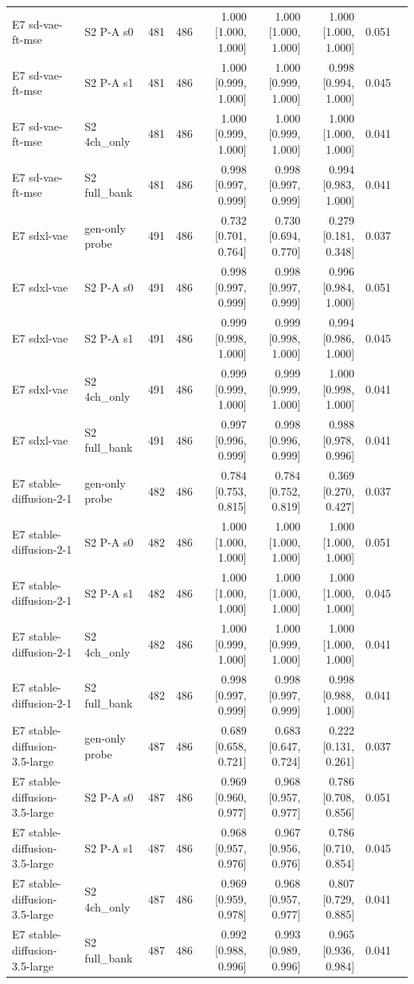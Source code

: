\begin{table}[htbp]
\begin{tabular}{llrrrrrrr}
E7 sd-vae-ft-mse & S2 P-A s0 & 481 & 486 & 1.000 [1.000, 1.000] & 1.000 [1.000, 1.000] & 1.000 [1.000, 1.000] & 0.051 &  \\
E7 sd-vae-ft-mse & S2 P-A s1 & 481 & 486 & 1.000 [0.999, 1.000] & 1.000 [0.999, 1.000] & 0.998 [0.994, 1.000] & 0.045 &  \\
E7 sd-vae-ft-mse & S2 4ch\_only & 481 & 486 & 1.000 [0.999, 1.000] & 1.000 [0.999, 1.000] & 1.000 [1.000, 1.000] & 0.041 &  \\
E7 sd-vae-ft-mse & S2 full\_bank & 481 & 486 & 0.998 [0.997, 0.999] & 0.998 [0.997, 0.999] & 0.994 [0.983, 1.000] & 0.041 &  \\
E7 sdxl-vae & gen-only probe & 491 & 486 & 0.732 [0.701, 0.764] & 0.730 [0.694, 0.770] & 0.279 [0.181, 0.348] & 0.037 &  \\
E7 sdxl-vae & S2 P-A s0 & 491 & 486 & 0.998 [0.997, 0.999] & 0.998 [0.997, 0.999] & 0.996 [0.984, 1.000] & 0.051 &  \\
E7 sdxl-vae & S2 P-A s1 & 491 & 486 & 0.999 [0.998, 1.000] & 0.999 [0.998, 1.000] & 0.994 [0.986, 1.000] & 0.045 &  \\
E7 sdxl-vae & S2 4ch\_only & 491 & 486 & 0.999 [0.999, 1.000] & 0.999 [0.999, 1.000] & 1.000 [0.998, 1.000] & 0.041 &  \\
E7 sdxl-vae & S2 full\_bank & 491 & 486 & 0.997 [0.996, 0.999] & 0.998 [0.996, 0.999] & 0.988 [0.978, 0.996] & 0.041 &  \\
E7 stable-diffusion-2-1 & gen-only probe & 482 & 486 & 0.784 [0.753, 0.815] & 0.784 [0.752, 0.819] & 0.369 [0.270, 0.427] & 0.037 &  \\
E7 stable-diffusion-2-1 & S2 P-A s0 & 482 & 486 & 1.000 [1.000, 1.000] & 1.000 [1.000, 1.000] & 1.000 [1.000, 1.000] & 0.051 &  \\
E7 stable-diffusion-2-1 & S2 P-A s1 & 482 & 486 & 1.000 [1.000, 1.000] & 1.000 [1.000, 1.000] & 1.000 [1.000, 1.000] & 0.045 &  \\
E7 stable-diffusion-2-1 & S2 4ch\_only & 482 & 486 & 1.000 [0.999, 1.000] & 1.000 [0.999, 1.000] & 1.000 [1.000, 1.000] & 0.041 &  \\
E7 stable-diffusion-2-1 & S2 full\_bank & 482 & 486 & 0.998 [0.997, 0.999] & 0.998 [0.997, 0.999] & 0.998 [0.988, 1.000] & 0.041 &  \\
E7 stable-diffusion-3.5-large & gen-only probe & 487 & 486 & 0.689 [0.658, 0.721] & 0.683 [0.647, 0.724] & 0.222 [0.131, 0.261] & 0.037 &  \\
E7 stable-diffusion-3.5-large & S2 P-A s0 & 487 & 486 & 0.969 [0.960, 0.977] & 0.968 [0.957, 0.977] & 0.786 [0.708, 0.856] & 0.051 &  \\
E7 stable-diffusion-3.5-large & S2 P-A s1 & 487 & 486 & 0.968 [0.957, 0.976] & 0.967 [0.956, 0.976] & 0.786 [0.710, 0.854] & 0.045 &  \\
E7 stable-diffusion-3.5-large & S2 4ch\_only & 487 & 486 & 0.969 [0.959, 0.978] & 0.968 [0.957, 0.977] & 0.807 [0.729, 0.885] & 0.041 &  \\
E7 stable-diffusion-3.5-large & S2 full\_bank & 487 & 486 & 0.992 [0.988, 0.996] & 0.993 [0.989, 0.996] & 0.965 [0.936, 0.984] & 0.041 &  \\
\bottomrule
\end{tabular}
\end{table}
